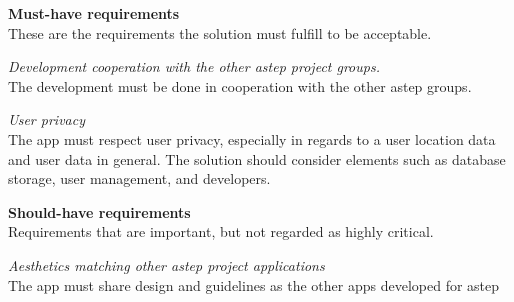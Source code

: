 \textbf{Must-have requirements}\\
These are the requirements the solution must fulfill to be acceptable.

\textit{Development cooperation with the other \gls{astep} project groups.}\\
The development must be done in cooperation with the other \gls{astep} groups.

\textit{User privacy}\\
The app must respect user privacy, especially in regards to a user location data and user data in general.
The solution should consider elements such as database storage, user management, and developers.

\textbf{Should-have requirements}\\
Requirements that are important, but not regarded as highly critical.

\textit{Aesthetics matching other \gls{astep} project applications}\\
The app must share design and guidelines as the other apps developed for \gls{astep}